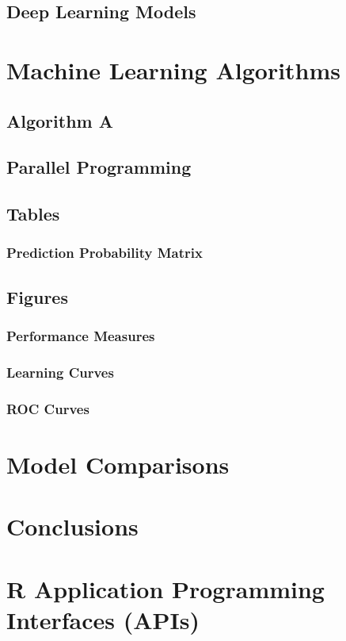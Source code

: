 \subsection{Deep Learning Models}

\section{Machine Learning Algorithms}

\subsection{Algorithm A}

\subsection{Parallel Programming}

\subsection{Tables}

\subsubsection{Prediction Probability Matrix}

\subsection{Figures}

\subsubsection{Performance Measures}

\subsubsection{Learning Curves}

\subsubsection{ROC Curves}

\section{Model Comparisons}

\section{Conclusions}


\section{R Application Programming Interfaces (APIs)}





\begin{thebibliography}{00}

\end{thebibliography}

